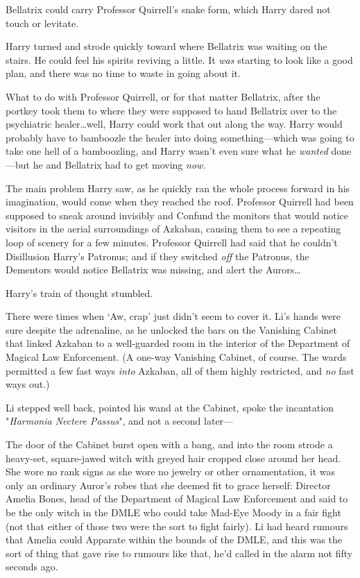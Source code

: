 Bellatrix could carry Professor Quirrell's snake form, which Harry dared not
touch or levitate.

Harry turned and strode quickly toward where Bellatrix was waiting on the
stairs. He could feel his spirits reviving a little. It \emph{was} starting to
look like a good plan, and there was no time to waste in going about it.

What to do with Professor Quirrell, or for that matter Bellatrix, after the
portkey took them to where they were supposed to hand Bellatrix over to the
psychiatric healer…well, Harry could work that out along the way. Harry
would probably have to bamboozle the healer into doing something—which was
going to take one hell of a bamboozling, and Harry wasn't even sure what he
\emph{wanted} done—but he and Bellatrix had to get moving \emph{now.}

The main problem Harry saw, as he quickly ran the whole process forward in his
imagination, would come when they reached the roof. Professor Quirrell had been
supposed to sneak around invisibly and Confund the monitors that would notice
visitors in the aerial surroundings of Azkaban, causing them to see a repeating
loop of scenery for a few minutes. Professor Quirrell had said that he couldn't
Disillusion Harry's Patronus; and if they switched \emph{off} the Patronus, the
Dementors would notice Bellatrix was missing, and alert the Aurors…

Harry's train of thought stumbled.

There were times when `Aw, crap' just didn't seem to cover it.
\later
Li's hands were sure despite the adrenaline, as he unlocked the bars on the
Vanishing Cabinet that linked Azkaban to a well-guarded room in the interior of
the Department of Magical Law Enforcement. (A one-way Vanishing Cabinet, of
course. The wards permitted a few fast ways \emph{into} Azkaban, all of them
highly restricted, and \emph{no} fast ways out.)

Li stepped well back, pointed his wand at the Cabinet, spoke the incantation
"\emph{Harmonia Nectere Passus}", and not a second later—

The door of the Cabinet burst open with a bang, and into the room strode a
heavy-set, square-jawed witch with greyed hair cropped close around her head.
She wore no rank signs as she wore no jewelry or other ornamentation, it was
only an ordinary Auror's robes that she deemed fit to grace herself: Director
Amelia Bones, head of the Department of Magical Law Enforcement and said to be
the only witch in the DMLE who could take Mad-Eye Moody in a fair fight (not
that either of those two were the sort to fight fairly). Li had heard rumours
that Amelia could Apparate within the bounds of the DMLE, and this was the sort
of thing that gave rise to rumours like that, he'd called in the alarm not fifty
seconds ago.

